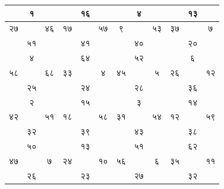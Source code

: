 \documentclass[11pt, openany]{book}
\begin{document}
\begin{table}[h]
\setlength{\extrarowheight}{1pt} \setlength{\tabcolsep}{1pt}	
\centering
\begin{tabular}{|c|c|c|c|c|c|c|c|c|c|c|c|}
	\hline
& 	१ &  &  & १६ & & & ४&  & & १३ &  \\
	\hline
२७ &  & ४६ & १७ &  & ५७ & ९ & & ५३ & ३७ & & ७\\
	\hline
&५१ &  &  & ४१ & & &  ४० &  & & २० & \\ 
	\hline
& ४ & & &  ६४ & & & ५२ & & &६ & \\
\hline
५८ & & ६८ & ३३ & &४ & ४५ & & ५ & २६ & &१२\\
\hline
& २५ & & & २४ & &  &  २८ & & & ३६ & \\
\hline
&  २ & & &  १५ &  &  &  ३ & & & १४ & \\
\hline
४२ & & ५१ & १८ & & ५८ & ३१ & & ५४ & १२ & & ५९ \\
\hline 
& ३२ & & & ३९ & & & ४३ & & &३८& \\
\hline
& ५० & & & १३ & & & ५१ & & & ६२ & \\
\hline
४७ & & ७ & २४ & & १० & ५६ & & ६ & ३५ & & ११\\
\hline
& २६ & & & २३ & &  & २७ & &  & ३२ & \\
\hline 
\end{tabular}
\end{table}

\newpage
\end{document}
